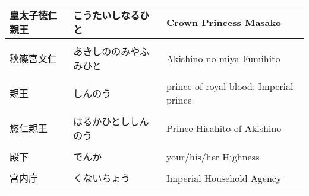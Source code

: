 \documentclass{article}
\begin{document}
\begin{tabular}{ l | l | p{7.5cm} }
皇太子徳仁親王 & こうたいしなるひと & Crown Princess Masako \\ \hline \\[-1em]
秋篠宮文仁 & あきしののみやふみひと & Akishino-no-miya Fumihito \\ \hline \\[-1em]
親王 & しんのう & prince of royal blood; Imperial prince \\ \hline \\[-1em]
悠仁親王 & はるかひとししんのう & Prince Hisahito of Akishino \\ \hline \\[-1em]
殿下 & でんか & your/his/her Highness \\ \hline \\[-1em]
宮内庁 & くないちょう & Imperial Household Agency \\ \hline \\[-1em]
\end{tabular}
\end{document}
